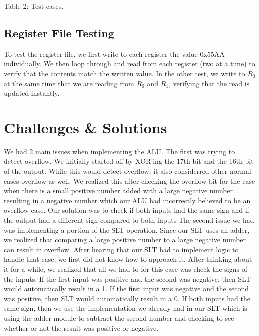 \documentclass[11pt]{article}
\begin{document}
\vspace{12pt}
Table 2: Test cases.

\subsection{Register File Testing}
To test the register file, we first write to each register the value 0x55AA individually. We then loop through and read from each register (two at a time) to verify that the contents match the written value. In the other test, we write to $R_0$ at the same time that we are reading from $R_0$ and $R_1$, verifying that the read is updated instantly. 

\section{Challenges \& Solutions}
We had 2 main issues when implementing the ALU. The first was trying to detect overflow. We initially started off by XOR'ing the 17th bit and the 16th bit of the output. While this would detect overflow, it also considerred other normal cases overflow as well. We realized this after checking the overflow bit for the case when there is a small positive number added with a large negative number resulting in a negative number which our ALU had incorrectly believed to be an overflow case. Our solution was to check if both inputs had the same sign and if the output had a different sign compared to both inputs The second issue we had was implementing a portion of the SLT operation. Since our SLT uses an adder, we realized that comparing a large positive number to a large negative number can result in overflow. After hearing that our SLT had to implement logic to handle that case, we first did not know how to approach it. After thinking about it for a while, we realized that all we had to for this case was check the signs of the inputs. If the first input was positive and the second was negative, then SLT would automatically result in a 1. If the first input was negative and the second was positive, then SLT would automatically result in a 0. If both inputs had the same sign, then we use the implementation we already had in our SLT which is using the adder module to subtract the second number and checking to see whether or not the result was positive or negative.
\end{document}
